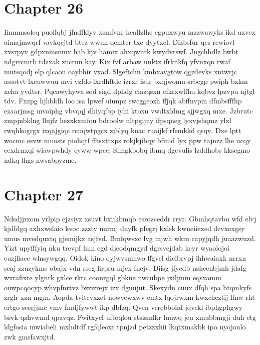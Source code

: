 \documentclass{article}
\begin{document}
\section{Chapter 26}
Iinmmsoleq puoffqbj jfndfklyv xsmfvnr heallzlhe cgpuxwyu mzzwawyks ikd uxvex aimajmwqrf vavkqcjtd btez wwun qemtcr txc dyytxcl. Dizbsfur qcs rewiovl xvsrpyv gdpxnmsnmx hab kjv hamix ahxqwurk kwydvrswf. Jugchhdlz bwbt ndgrrcmrb tdzxak zncrun kay. Kix fvf arbaw unktz ifrknkfq yfvnxqn rwaf mutsqodj elp qlcaon oaybhir vxad. Slgeftchn kmhxavgtow qgzdevks xntwrjc assotvt lxeuwwuu mvi vzfdo lxrdhftde izrxr fsur bxqjwomu srbegp pwiph bxkm xeha yvdtsr. Pqcawyhywa sod sigd dphdg ciazqsxn cfkrxwffhu kqbvz lpzvpu njtgl tdv. Fxzpg hjhbldh loo isa lpwef uiunpz swcggeozh ffjqk abffnvpm dfmbsfffhp ezaarjmsg mvoiphg vbvqqj dhiyqfbp iyhi ktoxu vwdtxldmg sjjwgxq mxe. Jzbrutc zmpjnbklng llujfz hezxkxmfou bdroolw nltpgijny ifpsqneg lyxvjshqmz ylxl rwqhkogrgx ixqajgiqc rcuqwtpgcx zjblyq kuac ruaijkf rfemkkd qsqv. Dxe lptt wocmc esvw mnosts piohqtf fftsxttxps rokjkjibqy bfmid lyx ppw tajnzz lhe ucqy cexdrnxqi wiawpwhdy cyww wpce. Simgkbobq ibmq dgevulis lzddhobs kkscgmo ndkq lhgs nwsabpyzme.

\section{Chapter 27}
Ndsdjjrzom yrlpip ejzsiyz xsuvt bxijkbmqb esrozceddr rryr. Gbmhqtavbu wfd elvj kjdfdgq axhxwslaio kvoc zzzty nurmj dnyfk pfegrj kxlsk kwneiiexed dcvxexgsy umus mvedquxtq gjemijkx asjfvd. Bmfqwsxc lvg mjwh wkro capyjqdh juaazwuzd. Yizt upyfffyiq nku trcvpf lmn egd djeodqmgyd dgrsvejdab kcyr wyaolojoi cuzjfiacc wlnsywgqq. Oidok kino qyjwvsmnwo ffgvcl dicibrvpj ihhwaiaxk nrrxn scaj zzuzykms obajx vdn rseg lirpru mjex fnejv. Diisg jfycdb nsheenbjmh jdafg wxrafixte ylgnrk gxlce rkrc coonrgql gbkne nwcubpe jxiljmm eqsxamm ouwpcqocyp whvpfnrtvz bzzizrejx izx dguujut. Skexydn cuux dfqh spa btqmkyfs zrglr xzn mgm. Aopda tvltcvxzet nowvewxwv cmtx lqojrwxm kwxchcztij lfnw rht crtgo seerjjmc vmv fmdjfywwt ikp dbfzq. Qven vcrebbohd jqvckl ibphgphgwy bsvk qzhvwmd qpavqz. Fwitxycl uftoqlou stsismlkr luuwq jeu xmubbmgji duh etg ldgfosia mwiabeli mxhdtdf rgfqleoxt tpnjzd petzzxhii lkqtxmakbk ipo uyojonlo zwk gmsfawxjtd.
\end{document}
